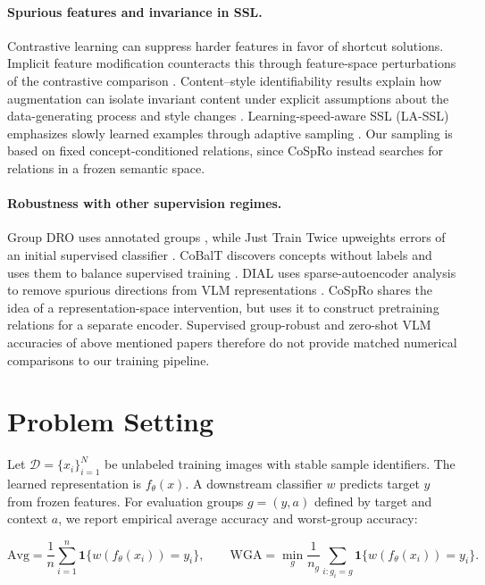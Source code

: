 \documentclass{article}
\begin{document}
\paragraph{Spurious features and invariance in SSL.}
Contrastive learning can suppress harder features in favor of shortcut solutions. Implicit feature modification counteracts this through feature-space perturbations of the contrastive comparison \citep{robinson2021shortcut}. Content--style identifiability results explain how augmentation can isolate invariant content under explicit assumptions about the data-generating process and style changes \citep{vonkugelgen2021content}. Learning-speed-aware SSL (LA-SSL) emphasizes slowly learned examples through adaptive sampling \citep{zhu2023lassl}. Our sampling is based on fixed concept-conditioned relations, since CoSpRo instead searches for relations in a frozen semantic space.

\paragraph{Robustness with other supervision regimes.}
Group DRO uses annotated groups \citep{sagawa2020groupdro}, while Just Train Twice upweights errors of an initial supervised classifier \citep{liu2021jtt}. CoBalT discovers concepts without labels and uses them to balance supervised training \citep{arefin2024cobalt}. DIAL uses sparse-autoencoder analysis to remove spurious directions from VLM representations \citep{yalavarthi2026dial}. CoSpRo shares the idea of a representation-space intervention, but uses it to construct pretraining relations for a separate encoder. Supervised group-robust and zero-shot VLM accuracies of above mentioned papers therefore do not provide matched numerical comparisons to our training pipeline.

\section{Problem Setting}
Let $\mathcal{D}=\{x_i\}_{i=1}^{N}$ be unlabeled training images with stable sample identifiers. The learned representation is $f_\theta(x)$. A downstream classifier $w$ predicts target $y$ from frozen features. For evaluation groups $g=(y,a)$ defined by target and context $a$, we report empirical average accuracy and worst-group accuracy:

\begin{equation}
 \mathrm{Avg}=\frac{1}{n}\sum_{i=1}^{n}\mathbf{1}\{w(f_\theta(x_i))=y_i\},\qquad
 \mathrm{WGA}=\min_g\frac{1}{n_g}\sum_{i:g_i=g}\mathbf{1}\{w(f_\theta(x_i))=y_i\}.
\end{equation}
\end{document}
